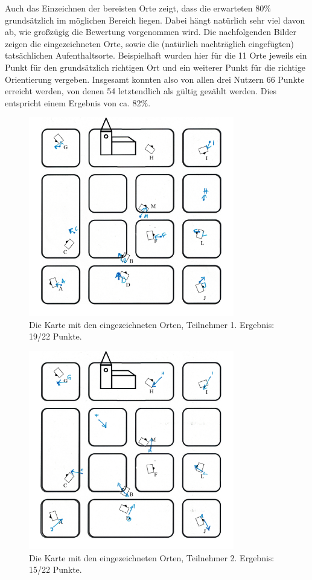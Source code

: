 \newpage
Auch das Einzeichnen der bereisten Orte zeigt, dass die erwarteten 80\% grundsätzlich im möglichen Bereich liegen. Dabei hängt natürlich sehr viel davon ab, wie großzügig die Bewertung vorgenommen wird. Die nachfolgenden Bilder zeigen die eingezeichneten Orte, sowie die (natürlich nachträglich eingefügten) tatsächlichen Aufenthaltsorte. Beispielhaft wurden hier für die 11 Orte jeweils ein Punkt für den grundsätzlich richtigen Ort und ein weiterer Punkt für die richtige Orientierung vergeben. Insgesamt konnten also von allen drei Nutzern 66 Punkte erreicht werden, von denen 54 letztendlich als gültig gezählt werden. Dies entspricht einem Ergebnis von ca. 82\%.


\begin{figure}[]
  \centering
  \includegraphics[width=0.8\textwidth]{images/map_full_with_curch_a.png}
  \caption{Die Karte mit den eingezeichneten Orten, Teilnehmer 1. Ergebnis: 19/22 Punkte.}
  \label{fig:todo}
\end{figure}


\begin{figure}[]
  \centering
  \includegraphics[width=0.8\textwidth]{images/map_full_with_curch_b.png}
  \caption{Die Karte mit den eingezeichneten Orten, Teilnehmer 2. Ergebnis: 15/22 Punkte.}
  \label{fig:todo}
\end{figure}


